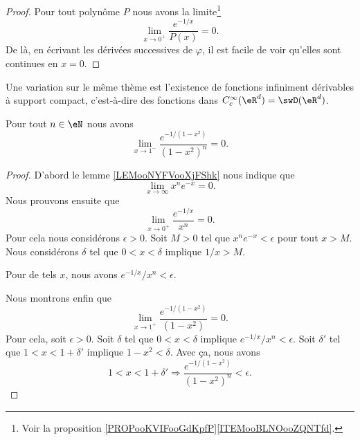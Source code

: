 \begin{proof}
	Pour tout polynôme \( P\) nous avons la limite\footnote{Voir la proposition \ref{PROPooKVIFooGdKpfP}\ref{ITEMooBLNOooZQNTfd}.}
	\begin{equation}
		\lim_{x\to 0^+} \frac{ e^{-1/x} }{ P(x)} =0 .
	\end{equation}
	De là, en écrivant les dérivées successives de \( \varphi\), il est facile de voir qu'elles sont continues en \( x=0\).
\end{proof}


Une variation sur le même thème est l'existence de fonctions infiniment dérivables à support compact, c'est-à-dire des fonctions dans \(  C^{\infty}_c(\eR^d)=\swD(\eR^d)\).

\begin{lemma}        \label{LEMooLHIFooWpbauN}
	Pour tout \( n\in \eN\) nous avons
	\begin{equation}
		\lim_{x\to 1^-} \frac{   e^{-1/(1-x^2)}  }{ (1-x^2)^n }=0.
	\end{equation}
\end{lemma}

\begin{proof}
	D'abord le lemme \ref{LEMooNYFVooXjFShk} nous indique que
	\begin{equation}
		\lim_{x\to \infty} x^n e^{-x}=0.
	\end{equation}
	Nous prouvons ensuite que
	\begin{equation}
		\lim_{x\to 0^+} \frac{  e^{-1/x} }{ x^n }=0.
	\end{equation}
	Pour cela nous considérons \( \epsilon>0\). Soit \( M>0\) tel que \( x^n e^{-x}<\epsilon\) pour tout \( x>M\). Nous considérons \( \delta\) tel que  \( 0<x<\delta\) implique \( 1/x>M\).

	Pour de tels \( x\), nous avons \(  e^{-1/x}/x^n<\epsilon\).

	Nous montrons enfin que
	\begin{equation}
		\lim_{x\to 1^+} \frac{ e^{-1/(1-x^2)} }{ (1-x^2) }=0.
	\end{equation}
	Pour cela, soit \( \epsilon>0\). Soit \( \delta\) tel que \( 0<x<\delta\) implique \(  e^{-1/x}/x^n<\epsilon\). Soit \( \delta'\) tel que \( 1<x<1+\delta'\) implique \( 1-x^2<\delta\). Avec ça, nous avons
	\begin{equation}
		1<x<1+\delta'\Rightarrow \frac{  e^{-1/(1-x^2)} }{ (1-x^2)^n }<\epsilon.
	\end{equation}
\end{proof}

